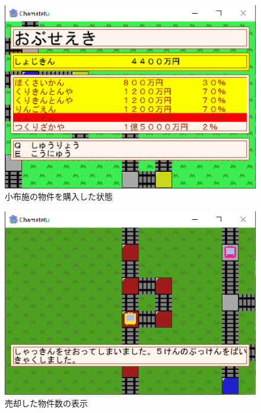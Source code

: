 \documentclass[a4j]{jarticle}
\begin{document}
    \begin{figure}[H]
        \centering
        \includegraphics[scale=1.3]{obuse.eps}
        \caption{小布施の物件を購入した状態}
         \label{mobuse}
        \end{figure}

    \begin{figure}[H]
        \centering
        \includegraphics[scale=1.3]{b5.eps}
        \caption{売却した物件数の表示}
         \label{b5}
        \end{figure}
\end{document}
